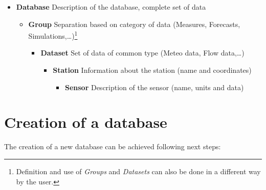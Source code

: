 \documentclass[
  letterpaper,
  DIV=11,
  numbers=noendperiod]{scrreprt}
\providecommand{\tightlist}{%
  \setlength{\itemsep}{0pt}\setlength{\parskip}{0pt}}\usepackage{longtable,booktabs,array}
\begin{document}
\begin{itemize}
\item
  \textbf{Database} Description of the database, complete set of data

  \begin{itemize}
  \item
    \textbf{Group} Separation based on category of data (Measures,
    Forecasts, Simulations,\ldots)\footnote{Definition and use of
      \emph{Groups} and \emph{Datasets} can also be done in a different
      way by the user.}

    \begin{itemize}
    \item
      \textbf{Dataset} Set of data of common type (Meteo data, Flow
      data,\ldots)

      \begin{itemize}
      \item
        \textbf{Station} Information about the station (name and
        coordinates)

        \begin{itemize}
        \tightlist
        \item
          \textbf{Sensor} Description of the sensor (name, units and
          data)
        \end{itemize}
      \end{itemize}
    \end{itemize}
  \end{itemize}
\end{itemize}

\hypertarget{creation-of-a-database}{%
\chapter{Creation of a database}\label{creation-of-a-database}}

The creation of a new database can be achieved following next steps:
\end{document}
